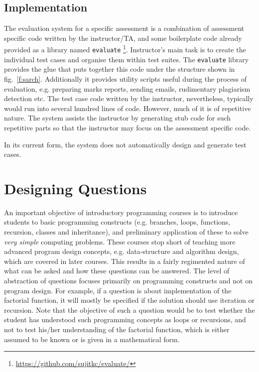 \documentclass[sigconf]{acmart}
\begin{document}
 
\subsection{Implementation}
The evaluation system for a specific assessment is a combination of assessment specific code written by the instructor/TA, and some boilerplate code already provided as a library named \lstinline|evaluate| \footnote{\href{https://github.com/sujitkc/evaluate/}{https://github.com/sujitkc/evaluate/}}. Instructor's main task is to create the individual test cases and organise them within test suites. The \lstinline|evaluate| library provides the glue that puts together this code under the structure shown in fig.~\ref{f:sarch}. Additionally it provides utility scripts useful during the process of evaluation, e.g. preparing marks reports, sending emails, rudimentary plagiarism detection etc. The test case code written by the instructor, nevertheless, typically would run into several hundred lines of code. However, much of it is of repetitive nature. The system assists the instructor by generating stub code for such repetitive parts so that the instructor may focus on the assessment specific code.

In its current form, the system does not automatically design and generate test cases.

\section{Designing Questions}
An important objective of introductory programming courses is to introduce students to basic programming constructs (e.g. branches, loops, functions, recursion, classes and inheritance), and preliminary application of these to solve \emph{very simple} computing problems. These courses stop short of teaching more advanced program design concepts, e.g. data-structure and algorithm design, which are covered in later courses. This results in a fairly regimented nature of what can be asked and how these questions can be answered. The level of abstraction of questions focuses primarily on programming constructs and not on program design. For example, if a question is about implementation of the factorial function, it will mostly be specified if the solution should use iteration or recursion. Note that the objective of such a question would be to test whether the student has understood such programming concepts as loops or recursions, and not to test his/her understanding of the factorial function, which is either assumed to be known or is given in a mathematical form.
\end{document}
